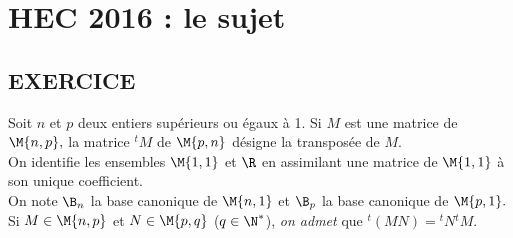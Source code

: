 \chapter*{HEC 2016 : le sujet}
  
%

\section*{EXERCICE} %

\noindent 
Soit $n$ et $p$ deux entiers supérieurs ou égaux à 1.
Si $M$ est une matrice de $\M{n,p},$ la matrice ${}^t{}M$ de 
$\M{p,n}$ désigne la transposée de $M.$\\
On identifie les ensembles $\M{1,1}$ et $\R$ en assimilant 
une matrice de $\M{1,1}$ à son unique coefficient.\\
On note $\B_n$ la base canonique de $\M{n,1}$ et 
$\B_p$ la base canonique de $\M{p,1}.$\\
Si $M \in \M{n,p}$ et $N \in \M{p,q}$ ($q 
\in \N^*$), {\it on admet} que 
${}^t{}{(MN)}={}^{t}{}{N}{}^{t}{}{M}$.

